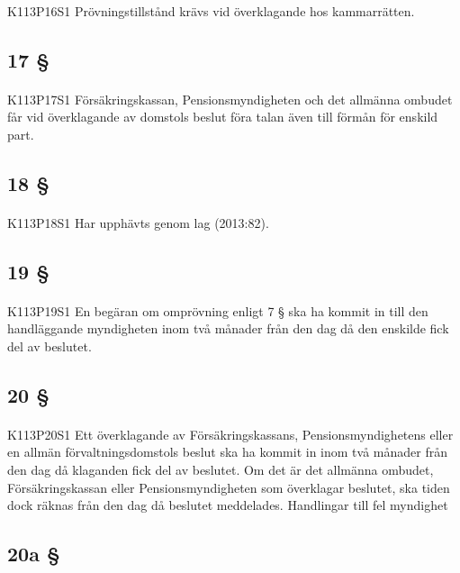 \documentclass[a4paper,notitlepage,openany,10pt]{book}
\begin{document}
\paragraph*{}
{\tiny K113P16S1}
Prövningstillstånd krävs vid överklagande hos kammarrätten.
\subsection*{17 §}
\paragraph*{}
{\tiny K113P17S1}
Försäkringskassan, Pensionsmyndigheten och det allmänna ombudet får vid överklagande av domstols beslut föra talan även till förmån för enskild part.
\subsection*{18 §}
\paragraph*{}
{\tiny K113P18S1}
Har upphävts genom
lag (2013:82).
\subsection*{19 §}
\paragraph*{}
{\tiny K113P19S1}
En begäran om omprövning enligt 7 § ska ha kommit in till den handläggande myndigheten inom två månader från den dag då den enskilde fick del av beslutet.
\subsection*{20 §}
\paragraph*{}
{\tiny K113P20S1}
Ett överklagande av Försäkringskassans, Pensionsmyndighetens eller en allmän förvaltningsdomstols beslut ska ha kommit in inom två månader från den dag då klaganden fick del av beslutet. Om det är det allmänna ombudet, Försäkringskassan eller Pensionsmyndigheten som överklagar beslutet, ska tiden dock räknas från den dag då beslutet meddelades.
Handlingar till fel myndighet
\subsection*{20a §}
\end{document}
